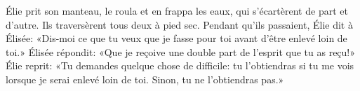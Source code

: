 Élie prit son manteau, le roula et en frappa les eaux,
	qui s’écartèrent de part et d’autre.
	Ils traversèrent tous deux à pied sec.
Pendant qu’ils passaient, Élie dit à Élisée:
	«Dis-moi ce que tu veux que je fasse pour toi avant d’être enlevé loin de toi.»
Élisée répondit: «Que je reçoive une double part de l’esprit que tu as reçu!»
Élie reprit: «Tu demandes quelque chose de difficile:
	tu l’obtiendras si tu me vois lorsque je serai enlevé loin de toi.
	Sinon, tu ne l’obtiendras pas.»
